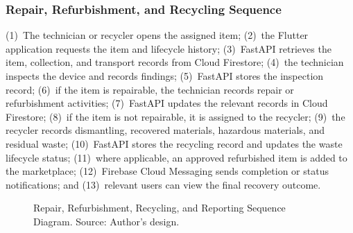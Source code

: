 \subsubsection{Repair, Refurbishment, and Recycling Sequence}
(1)~The technician or recycler opens the assigned item; (2)~the Flutter
application requests the item and lifecycle history; (3)~FastAPI retrieves the
item, collection, and transport records from Cloud Firestore; (4)~the
technician inspects the device and records findings; (5)~FastAPI stores the
inspection record; (6)~if the item is repairable, the technician records repair
or refurbishment activities; (7)~FastAPI updates the relevant records in Cloud
Firestore; (8)~if the item is not repairable, it is assigned to the recycler;
(9)~the recycler records dismantling, recovered materials, hazardous
materials, and residual waste; (10)~FastAPI stores the recycling record and
updates the waste lifecycle status; (11)~where applicable, an approved
refurbished item is added to the marketplace; (12)~Firebase Cloud Messaging
sends completion or status notifications; and (13)~relevant users can view the
final recovery outcome.
\begin{figure}[H]
  \centering
  \caption{Repair, Refurbishment, Recycling, and Reporting Sequence Diagram. Source: Author's design.}
  \label{fig:seq-repair}
\end{figure}

